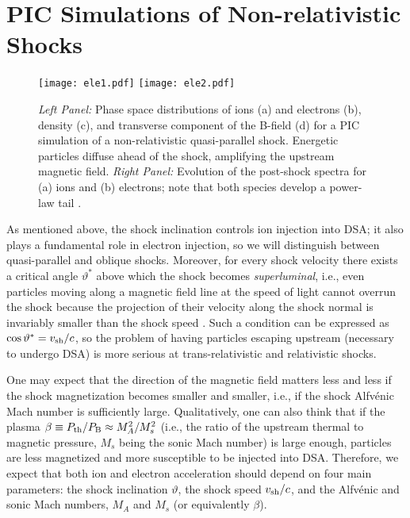 \documentclass[varenna]{cimento}
\newcommand{\vsh}{v_{\rm sh}}
\newcommand\thbn{\vartheta}
\begin{document}
\section{PIC Simulations of Non-relativistic Shocks\label{sec:pioneer}}
\begin{figure}
\centering
\vspace{-5mm}
\texttt{[image: ele1.pdf]}
\texttt{[image: ele2.pdf]}
\caption{\label{fig:ele} 
\emph{Left Panel:} Phase space distributions of ions (a) and electrons (b), density (c), and transverse component of the B-field (d) for a PIC simulation of a non-relativistic quasi-parallel shock.
Energetic particles diffuse ahead of the shock, amplifying the upstream magnetic field.
\emph{Right Panel:} Evolution of the post-shock spectra for (a) ions and (b) electrons; note that both species develop a power-law tail \cite{park+15}.
}
\end{figure}

As mentioned above, the shock inclination controls ion injection into DSA; it also plays a fundamental role in electron injection, so we will distinguish between quasi-parallel and oblique shocks. 
Moreover, for every shock velocity there exists a critical angle $\thbn^*$ above which the shock becomes \emph{superluminal}, i.e., even particles moving along a magnetic field line at the speed of light cannot overrun the shock because the projection of their velocity along the shock normal is invariably smaller than the shock speed \cite{sironi+09}.
Such a condition can be expressed as $\cos{\thbn^*}=\vsh/c$, so the problem of having particles escaping upstream (necessary to undergo DSA) is more serious at trans-relativistic and relativistic shocks.

One may expect that the direction of the magnetic field matters less and less if the shock magnetization becomes smaller and smaller, i.e., if the shock Alfv\'enic Mach number is sufficiently large. 
Qualitatively, one can also think that if the plasma $\beta\equiv P_{\rm th}/P_{\rm B}\approx M_A^2/M_s^2$ (i.e., the ratio of the upstream thermal to magnetic pressure, $M_s$ being the sonic Mach number) is large enough, particles are less magnetized and more susceptible to be injected into DSA. 
Therefore, we expect that both ion and electron acceleration should depend on four main parameters: the shock inclination $\thbn$, the shock speed $\vsh/c$, and the Alfv\'enic and sonic Mach numbers, $M_A$ and $M_s$ (or equivalently $\beta$).
\end{document}
